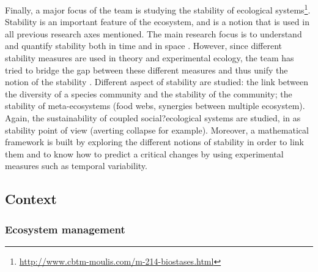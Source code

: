 \documentclass{article}
\begin{document}
Finally, a major focus of the team is studying the stability of ecological systems\footnote{\url{http://www.cbtm-moulis.com/m-214-biostases.html}}. Stability is an important feature of the ecosystem, and is a notion that is used in all previous research axes mentioned. The main research focus is to understand and quantify stability both in time and in space \cite{wang2017invariability}\cite{zelnik2018impact}. However, since different stability measures are used in theory and experimental ecology, the team has tried to bridge the gap between these different measures and thus unify the notion of the stability \cite{arnoldi2018ecosystems}\cite{barbier2019pyramids}.
Different aspect of stability are studied: the link between the diversity of a species community and the stability of the community\cite{vallina2017phytoplankton}; the stability of meta-ecosystems (food webs, synergies between multiple ecosystem)\cite{arnoldi2016particularity}\cite{lurgi2016effects}\cite{wang2016biodiversity}. 
Again, the sustainability of coupled social?ecological systems are studied, in as stability point of view (averting collapse for example).
 Moreover, a mathematical framework is built by exploring the different notions of stability in order to link them \cite{arnoldi2018ecosystems}\cite{arnoldi2016unifying}\cite{donohue2016navigating} and to know how to predict a critical changes by using experimental measures such as temporal variability\cite{arnoldi2016resilience}\cite{haegeman2016resilience}\cite{wang2017invariability}. 



\newpage


\subsection*{Context}

\subsubsection*{Ecosystem management}
\end{document}
